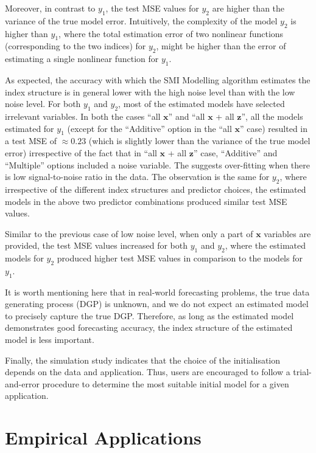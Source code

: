 \documentclass[
  11pt,
  a4paper,
]{article}
\begin{document}
Moreover, in contrast to \(y_{1}\), the test MSE values for \(y_{2}\)
are higher than the variance of the true model error. Intuitively, the
complexity of the model \(y_{2}\) is higher than \(y_{1}\), where the
total estimation error of two nonlinear functions (corresponding to the
two indices) for \(y_{2}\), might be higher than the error of estimating
a single nonlinear function for \(y_{1}\).

As expected, the accuracy with which the SMI Modelling algorithm
estimates the index structure is in general lower with the high noise
level than with the low noise level. For both \(y_{1}\) and \(y_{2}\),
most of the estimated models have selected irrelevant variables. In both
the cases ``all \(\bm{x}\)'' and ``all \(\bm{x}\) + all \(\bm{z}\)'',
all the models estimated for \(y_{1}\) (except for the ``Additive''
option in the ``all \(\bm{x}\)'' case) resulted in a test MSE of
\(\approx 0.23\) (which is slightly lower than the variance of the true
model error) irrespective of the fact that in ``all \(\bm{x}\) + all
\(\bm{z}\)'' case, ``Additive'' and ``Multiple'' options included a
noise variable. The suggests over-fitting when there is low
signal-to-noise ratio in the data. The observation is the same for
\(y_{2}\), where irrespective of the different index structures and
predictor choices, the estimated models in the above two predictor
combinations produced similar test MSE values.

Similar to the previous case of low noise level, when only a part of
\(\bm{x}\) variables are provided, the test MSE values increased for
both \(y_{1}\) and \(y_{2}\), where the estimated models for \(y_{2}\)
produced higher test MSE values in comparison to the models for
\(y_{1}\).

It is worth mentioning here that in real-world forecasting problems, the
true data generating process (DGP) is unknown, and we do not expect an
estimated model to precisely capture the true DGP. Therefore, as long as
the estimated model demonstrates good forecasting accuracy, the index
structure of the estimated model is less important.

Finally, the simulation study indicates that the choice of the
initialisation depends on the data and application. Thus, users are
encouraged to follow a trial-and-error procedure to determine the most
suitable initial model for a given application.

\section{Empirical Applications}\label{sec-application}
\end{document}
